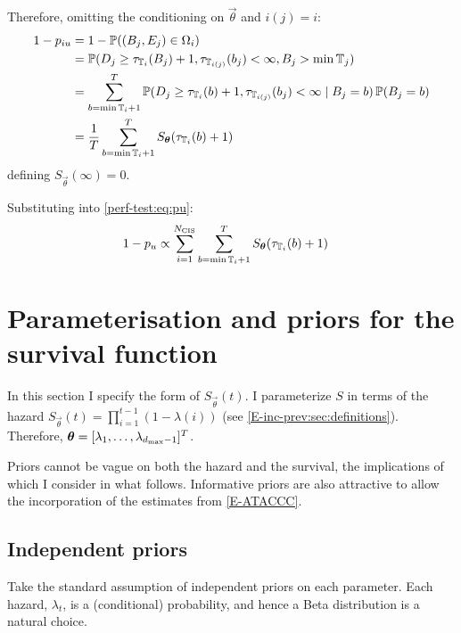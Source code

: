 \documentclass[thesis.tex]{subfiles}
\begin{document}
Therefore, omitting the conditioning on $\vec{\theta}$ and $i(j) = i$:
\begin{align}
1 - p_{iu}
&= 1 - \operatorname{\mathbb{P}}((B_{j}, E_{j}) \in \Omega_i) \\
&= \operatorname{\mathbb{P}}(D_j \geq \tau_{\mathbb{T}_{i}}(B_j)+ 1, \tau_{\mathbb{T}_{i(j)}}(b_j) < \infty, B_j > \min \mathbb{T}_{j}) \\
&= \sum_{b = \min \mathbb{T}_{i} + 1}^T \operatorname{\mathbb{P}}(D_j \geq \tau_{\mathbb{T}_{i}}(b) + 1, \tau_{\mathbb{T}_{i(j)}}(b_j) < \infty \mid B_j = b) \operatorname{\mathbb{P}}(B_j = b)\\
&= \frac{1}{T} \sum_{b = \min \mathbb{T}_{i} + 1}^T S_{\bm{\theta}}(\tau_{\mathbb{T}_{i}}(b) + 1)
\label{perf-test:eq:piu}
\end{align}
defining $S_{\vec{\theta}}(\infty) = 0$.

Substituting into \cref{perf-test:eq:pu}:
\begin{align}
1 - p_u
& \propto \sum_{i=1}^{N_\text{CIS}} \sum_{b = \min \mathbb{T}_{i} + 1}^T S_{\bm{\theta}}(\tau_{\mathbb{T}_{i}}(b) + 1)
\end{align}

\section{Parameterisation and priors for the survival function} \label{perf-test:sec:parameters-priors}

In this section I specify the form of $S_{\vec{\theta}}(t)$.
I parameterize $S$ in terms of the hazard $S_{\vec{\theta}}(t) = \prod_{i=1}^{t-1} (1 - \lambda(i))$ (see \cref{E-inc-prev:sec:definitions}).
Therefore, $\bm{\theta} = [\lambda_1, \dots, \lambda_{d_\text{max}-1}]^T$.

Priors cannot be vague on both the hazard and the survival, the implications of which I consider in what follows.
Informative priors are also attractive to allow the incorporation of the estimates from \cref{E-ATACCC}.

\subsection{Independent priors} \label{perf-test:sec:independent-priors}
Take the standard assumption of independent priors on each parameter.
Each hazard, $\lambda_t$, is a (conditional) probability, and hence a Beta distribution is a natural choice.
\end{document}
